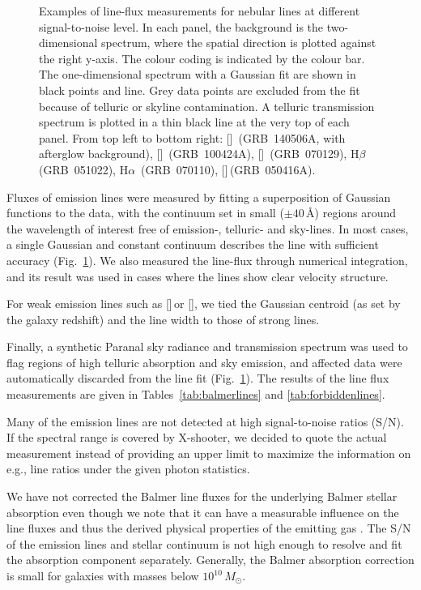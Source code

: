 \documentclass[traditabstract, longauth]{aa}
\newcommand{\hb}{H$\beta$}
\newcommand{\ha}{H$\alpha$}
\newcommand{\oii}{[\ion{O}{ii}]}
\newcommand{\oiii}{[\ion{O}{iii}]}
\newcommand{\neiii}{[\ion{Ne}{iii}]}
\newcommand{\nii}{[\ion{N}{ii}]}
\newcommand{\Msun}{$M_\odot$}
\begin{document}
\begin{figure}
\begin{subfigure}{.33\textwidth}
\end{subfigure}
\caption{ {Examples of line-flux measurements for nebular lines at different signal-to-noise level. In each panel, the background is the two-dimensional spectrum, where the spatial direction is plotted against the right y-axis. The colour coding is indicated by the colour bar. The one-dimensional spectrum with a Gaussian fit are shown in black points and line. Grey data points are excluded from the fit because of telluric or skyline contamination. A telluric transmission spectrum is plotted in a thin black line at the very top of each panel. From top left to bottom right: \oii\, (GRB~140506A, with afterglow background), \neiii\, (GRB~100424A), \oiii\, (GRB~070129), \hb\, (GRB~051022), \ha\, (GRB~070110), \nii\,(GRB~050416A).}}
\label{fig:lineexamples}
\end{figure}

Fluxes of emission lines were measured by fitting a superposition of Gaussian functions to the data, with the continuum set in small ($\pm40$\,\AA) regions around the wavelength of interest free of emission-, telluric- and sky-lines. In most cases, a single Gaussian and constant continuum describes the line with sufficient accuracy (Fig.~\ref{fig:lineexamples}). We also measured the line-flux through numerical integration, and its result was used in cases where the lines show clear velocity structure.

For weak emission lines such as \neiii\,or \nii, we tied the Gaussian centroid (as set by the galaxy redshift) and the line width to those of strong lines. 

Finally, a synthetic Paranal sky radiance and transmission spectrum \citep{2012A&A...543A..92N} was used to flag regions of high telluric absorption and sky emission, and affected data were automatically discarded from the line fit (Fig.~\ref{fig:lineexamples}). The results of the line flux measurements are given in Tables~\ref{tab:balmerlines} and \ref{tab:forbiddenlines}. 

Many of the emission lines are not detected at high signal-to-noise ratios (S/N). If the spectral range is covered by X-shooter, we decided to quote the actual measurement instead of providing an upper limit to maximize the information on e.g., line ratios under the given photon statistics.




We have not corrected the Balmer line fluxes for the underlying Balmer stellar absorption even though we note that it can have a measurable influence on the line fluxes and thus the derived physical properties of the emitting gas \citep{2011MNRAS.414.2793W}. The S/N of the emission lines and stellar continuum is not high enough to resolve and fit the absorption component separately. Generally, the Balmer absorption correction is small for galaxies with masses below $10^{10}$\,\Msun. 
\end{document}
